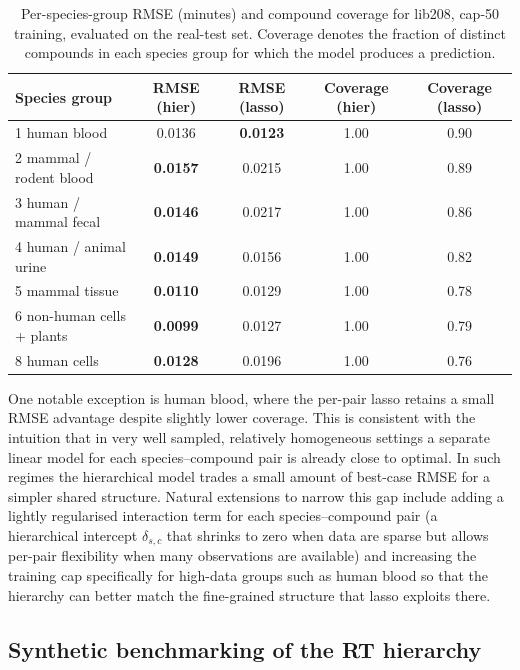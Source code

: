 \documentclass[11pt]{article}
\begin{document}
\begin{table}[H]
\centering
\begin{tabular}{lcccc}
\hline
Species group & RMSE (hier) & RMSE (lasso) & Coverage (hier) & Coverage (lasso) \\
\hline
1 human blood              & 0.0136 & \textbf{0.0123} & 1.00 & 0.90 \\
2 mammal / rodent blood    & \textbf{0.0157} & 0.0215 & 1.00 & 0.89 \\
3 human / mammal fecal     & \textbf{0.0146} & 0.0217 & 1.00 & 0.86 \\
4 human / animal urine     & \textbf{0.0149} & 0.0156 & 1.00 & 0.82 \\
5 mammal tissue            & \textbf{0.0110} & 0.0129 & 1.00 & 0.78 \\
6 non-human cells + plants & \textbf{0.0099} & 0.0127 & 1.00 & 0.79 \\
8 human cells              & \textbf{0.0128} & 0.0196 & 1.00 & 0.76 \\
\hline
\end{tabular}
\caption{Per-species-group RMSE (minutes) and compound coverage for lib208, cap-50
training, evaluated on the real-test set. Coverage denotes the fraction of distinct
compounds in each species group for which the model produces a prediction.}
\label{tab:rmse_by_group_lib208}
\end{table}

One notable exception is human blood, where the per-pair lasso retains a small RMSE
advantage despite slightly lower coverage. This is consistent with the intuition that
in very well sampled, relatively homogeneous settings a separate linear model for each
species--compound pair is already close to optimal. In such regimes the hierarchical
model trades a small amount of best-case RMSE for a simpler shared structure. Natural
extensions to narrow this gap include adding a lightly regularised interaction term
for each species--compound pair (a hierarchical intercept $\delta_{s,c}$ that shrinks
to zero when data are sparse but allows per-pair flexibility when many observations
are available) and increasing the training cap specifically for high-data groups such
as human blood so that the hierarchy can better match the fine-grained structure that
lasso exploits there.

\subsection{Synthetic benchmarking of the RT hierarchy}
\end{document}
